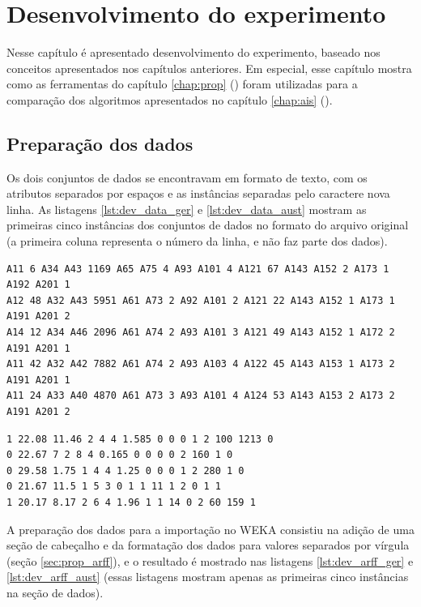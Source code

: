\chapter{Desenvolvimento do experimento}

Nesse capítulo é apresentado desenvolvimento do experimento, baseado nos conceitos apresentados nos capítulos anteriores. Em especial, esse capítulo mostra como as ferramentas do capítulo \ref{chap:prop} () foram utilizadas para a comparação dos algoritmos apresentados no capítulo \ref{chap:ais} ().

\section{Preparação dos dados}

Os dois conjuntos de dados se encontravam em formato de texto, com os atributos separados por espaços e as instâncias separadas pelo caractere nova linha. As listagens \ref{lst:dev_data_ger} e \ref{lst:dev_data_aust} mostram as primeiras cinco instâncias dos conjuntos de dados no formato do arquivo original (a primeira coluna representa o número da linha, e não faz parte dos dados).

\vspace{0.5cm}
\begin{lstlisting}[caption=Formato original dos dados (\emph{Cr.Ger}), label=lst:dev_data_ger]
A11 6 A34 A43 1169 A65 A75 4 A93 A101 4 A121 67 A143 A152 2 A173 1 A192 A201 1
A12 48 A32 A43 5951 A61 A73 2 A92 A101 2 A121 22 A143 A152 1 A173 1 A191 A201 2
A14 12 A34 A46 2096 A61 A74 2 A93 A101 3 A121 49 A143 A152 1 A172 2 A191 A201 1
A11 42 A32 A42 7882 A61 A74 2 A93 A103 4 A122 45 A143 A153 1 A173 2 A191 A201 1
A11 24 A33 A40 4870 A61 A73 3 A93 A101 4 A124 53 A143 A153 2 A173 2 A191 A201 2
\end{lstlisting}
\vspace{0.5cm}

\vspace{0.5cm}
\begin{lstlisting}[caption=Formato original dos dados (\emph{Cr.Aust}), label=lst:dev_data_aust]
1 22.08 11.46 2 4 4 1.585 0 0 0 1 2 100 1213 0
0 22.67 7 2 8 4 0.165 0 0 0 0 2 160 1 0
0 29.58 1.75 1 4 4 1.25 0 0 0 1 2 280 1 0
0 21.67 11.5 1 5 3 0 1 1 11 1 2 0 1 1
1 20.17 8.17 2 6 4 1.96 1 1 14 0 2 60 159 1
\end{lstlisting}
\vspace{0.5cm}

A preparação dos dados para a importação no WEKA consistiu na adição de uma seção de cabeçalho e da formatação dos dados para valores separados por vírgula (seção \ref{sec:prop_arff}), e o resultado é mostrado nas listagens \ref{lst:dev_arff_ger} e \ref{lst:dev_arff_aust} (essas listagens mostram apenas as primeiras cinco instâncias na seção de dados).


